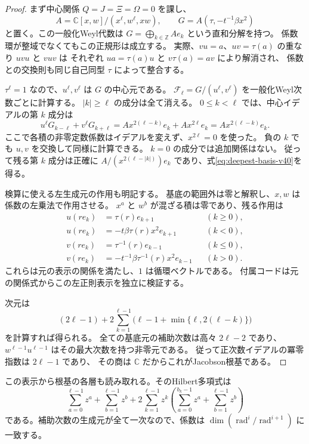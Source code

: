 \begin{proof}
まず中心関係 $Q=J=\Xi=\Omega=0$ を課し、
\[
 A=\mathbb C[x,w]/(x^\ell,w^\ell,xw),\qquad
 G=A(\tau,-t^{-1}\beta x^2)
\]
と置く。この一般化Weyl代数は
$G=\bigoplus_{k\in\mathbb Z}Ae_k$ という直和分解を持つ。
係数環が整域でなくてもこの正規形は成立する。
実際、$vu=a$、$uv=\tau(a)$ の重なり $uvu$ と $vuv$ は
それぞれ $u a=\tau(a)u$ と $v\tau(a)=av$ により解消され、
係数との交換則も同じ自己同型 $\tau$ によって整合する。

$\tau^\ell=1$ なので、$u^\ell,v^\ell$ は $G$ の中心元である。
$\mathcal F_\ell=G/(u^\ell,v^\ell)$ を一般化Weyl次数ごとに計算する。
$|k|\ge\ell$ の成分は全て消える。
$0\le k<\ell$ では、中心イデアルの第 $k$ 成分は
\[
 u^\ell G_{k-\ell}+v^\ell G_{k+\ell}
 =A x^{2(\ell-k)}e_k+A x^{2\ell}e_k
 =A x^{2(\ell-k)}e_k.
\]
ここで各積の非零定数係数はイデアルを変えず、$x^{2\ell}=0$ を使った。
負の $k$ でも $u,v$ を交換して同様に計算できる。
$k=0$ の成分では追加関係はない。
従って残る第 $k$ 成分は正確に
$A/(x^{2(\ell-|k|)})e_k$ であり、式\eqref{eq:deepest-basis-v40}を得る。

検算に使える左生成元の作用も明記する。
基底の範囲外は零と解釈し、$x,w$ は係数の左乗法で作用させる。
$x^a$ と $w^b$ が混ざる積は零であり、残る作用は
\[
\begin{aligned}
 u(re_k)&=\tau(r)e_{k+1}&& (k\ge0),\\
 u(re_k)&=-t\beta\tau(r)x^2e_{k+1}&& (k<0),\\
 v(re_k)&=\tau^{-1}(r)e_{k-1}&& (k\le0),\\
 v(re_k)&=-t^{-1}\beta\tau^{-1}(r)x^2e_{k-1}&& (k>0).
\end{aligned}
\]
これらは元の表示の関係を満たし、$1$ は循環ベクトルである。
付属コードは元の関係式からこの左正則表示を独立に検証する。

次元は
\[
 (2\ell-1)+2\sum_{k=1}^{\ell-1}
 \bigl(\ell-1+\min\{\ell,2(\ell-k)\}\bigr)
\]
を計算すれば得られる。
全ての基底元の補助次数は高々 $2\ell-2$ であり、
$w^{\ell-1}u^{\ell-1}$ はその最大次数を持つ非零元である。
従って正次数イデアルの冪零指数は $2\ell-1$ であり、
その商は $\mathbb C$ だからこれがJacobson根基である。
\end{proof}

この表示から根基の各層も読み取れる。そのHilbert多項式は
\[
 \sum_{a=0}^{\ell-1}z^a+\sum_{b=1}^{\ell-1}z^b
 +2\sum_{k=1}^{\ell-1}z^k
 \left(\sum_{a=0}^{b_k-1}z^a+\sum_{b=1}^{\ell-1}z^b\right)
\]
である。補助次数の生成元が全て一次なので、係数は
$\dim(\operatorname{rad}^i/\operatorname{rad}^{i+1})$ に一致する。


